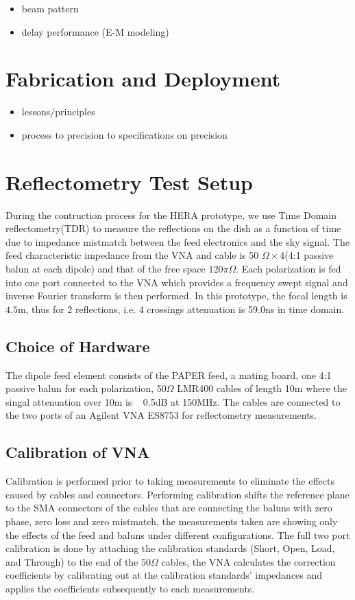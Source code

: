 \documentclass[preprint]{aastex}  %
\begin{document}
\begin{itemize}
\item beam pattern
\item delay performance (E-M modeling)
\end{itemize}

\section{Fabrication and Deployment}
\label{sec:deploy}

\begin{itemize}
\item lessons/principles
\item process to precision to specifications on precision
\end{itemize}


\section{Reflectometry Test Setup}
\label{sec:reflect}
During the contruction process for the HERA prototype, we use Time Domain reflectometry(TDR) to measure the reflections on the dish as a function of time due to impedance mistmatch between the feed electronics and the sky signal. The feed characteristic impedance from the VNA and cable is 50 $\Omega\times4 $(4:1 passive balun at each dipole) and that of the free space $120\pi\Omega$. Each polarization is fed into one port connected to the VNA which provides a frequency swept signal and inverse Fourier transform is then performed.  In this prototype, the focal length is $4.5$m, thus for 2 reflections, i.e. 4 crossings attenuation is 59.0ns in time domain.


\subsection{Choice of Hardware}
The dipole feed element consists of the PAPER feed, a mating board, one 4:1 passive balun for each polarization, 50$\Omega$ LMR400 cables of length 10m where the singal attenuation over 10m is ~ 0.5dB at 150MHz. 
The cables are connected to the two ports of an Agilent VNA ES8753 for reflectometry measurements. 


\subsection{Calibration of VNA}
Calibration is performed prior to taking measurements to eliminate the effects caused by cables and connectors. Performing calibration shifts the reference plane to the SMA connectors of the cables that are connecting the baluns with zero phase, zero loss and zero mistmatch, the measurements taken are showing only the effects of the feed and baluns under different configurations. The full two port calibration is done by attaching the calibration standards (Short, Open, Load, and Through) to the end of the $50\Omega$ cables, the VNA calculates the correction coefficients by calibrating out at the calibration standards' impedances and applies the coefficients subsequently to each measurements.
\end{document}
